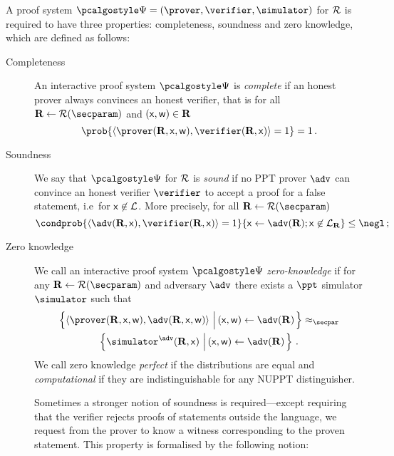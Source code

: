 \documentclass[runningheads,11pt]{llncs}
\theoremstyle{definition}
\begin{document}
A proof system $\proofsystem = (\prover, \verifier, \simulator)$ for $\mathcal{R}$ is required to have three properties: completeness, soundness and zero knowledge, which are defined as follows:
\begin{description}
	\item[Completeness] An interactive proof system $\proofsystem$ is \emph{complete} if an honest prover always convinces an honest verifier, that is for all $\REL \gets \RELGEN(\secparam)$ and $(\mathsf{x}, \mathsf{w}) \in \mathbf{R}$
	\[
		\prob{\ip{\prover (\REL, \inp, \wit)}{\verifier (\REL, \inp)} = 1} = 1\,.
	\]
	\item[Soundness] We say that $\proofsystem$ for $\mathcal{R}$ is \emph{sound} if no PPT prover $\adv$ can convince an honest verifier $\verifier$ to accept a proof for a false statement, i.e~for $\mathsf{x} \not\in\mathcal{L}$. More precisely, for all $\REL \gets \RELGEN(\secparam)$
	\[
		\condprob{\ip{\adv(\REL, \inp)}{\verifier(\REL, \inp)} = 1}{\inp \gets \adv(\REL); \inp \not\in \LANG_\REL} \leq \negl\,;
	\]
	\item[Zero knowledge] We call an interactive proof system $\proofsystem$ \emph{zero-knowledge} if for any $\REL \gets \RELGEN(\secparam)$ and adversary $\adv$ there exists a $\ppt$ simulator $\simulator$ such that
	\begin{multline*}
	  \left\{\ip{\prover(\REL, \inp, \wit)}{\adv(\REL, \inp, \wit)} \,\left|\, (\inp, \wit) \gets \adv(\REL)\vphantom{\simulator^\adv}\right.\right\} \approx_\secpar
		\\
		\left\{\simulator^{\adv}(\REL, \inp)\,\left|\, (\inp, \wit) \gets \adv(\REL)\vphantom{\simulator^\adv}\right.\right\}\,.
	\end{multline*}
	We call zero knowledge \emph{perfect} if the distributions are equal and \emph{computational} if they are indistinguishable for any NUPPT distinguisher.
	
	Sometimes a stronger notion of soundness is required---except requiring that the verifier rejects proofs of statements outside the language, we request from the prover to know a witness corresponding to the proven statement. This property is formalised by the following notion:
	

\end{description}
\end{document}
